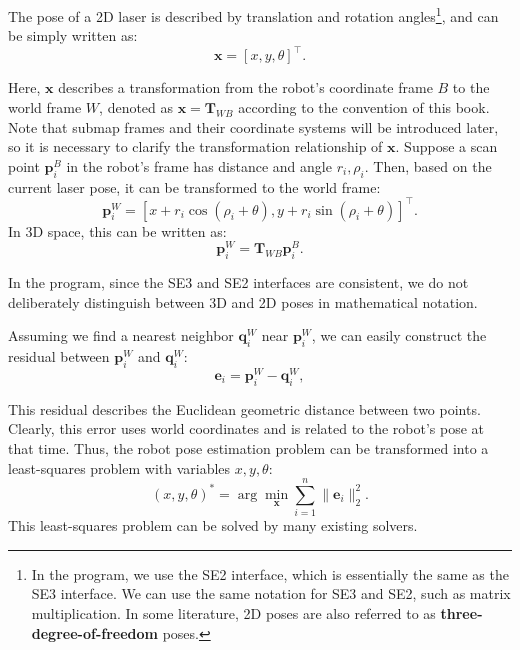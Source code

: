 The pose of a 2D laser is described by translation and rotation angles\footnote{In the program, we use the SE2 interface, which is essentially the same as the SE3 interface. We can use the same notation for SE3 and SE2, such as matrix multiplication. In some literature, 2D poses are also referred to as \textbf{three-degree-of-freedom} poses.}, and can be simply written as:
\begin{equation}\label{key}
	\bm{x} = [x, y, \theta]^\top.
\end{equation}

Here, $\bm{x}$ describes a transformation from the robot's coordinate frame $B$ to the world frame $W$, denoted as $\bm{x} = \bm{T}_{WB}$ according to the convention of this book. Note that submap frames and their coordinate systems will be introduced later, so it is necessary to clarify the transformation relationship of $\bm{x}$. Suppose a scan point $\bm{p}_i^B$ in the robot's frame has distance and angle $r_i, \rho_i$. Then, based on the current laser pose, it can be transformed to the world frame:
\begin{equation}\label{key}
	\bm{p}^W_i = [x+r_i \cos (\rho_i + \theta), y+r_i \sin(\rho_i + \theta)]^\top.
\end{equation}
In 3D space, this can be written as:
\begin{equation}\label{key}
	\bm{p}^W_i = \bm{T}_{WB} \bm{p}^B_i.
\end{equation}

In the program, since the SE3 and SE2 interfaces are consistent, we do not deliberately distinguish between 3D and 2D poses in mathematical notation.

Assuming we find a nearest neighbor $\bm{q}_i^W$ near $\bm{p}_i^W$, we can easily construct the residual between $\bm{p}_i^W$ and $\bm{q}_i^W$:
\begin{equation}\label{key}
	\bm{e}_i = \bm{p}_i^W - \bm{q}_i^W,
\end{equation}

This residual describes the Euclidean geometric distance between two points. Clearly, this error uses world coordinates and is related to the robot's pose at that time. Thus, the robot pose estimation problem can be transformed into a least-squares problem with variables $x, y, \theta$:
\begin{equation}\label{key}
	(x,y,\theta)^* = \arg \min\limits_{\bm{x}} \sum_{i=1}^n \| \bm{e}_i \|_2^2.
\end{equation}
This least-squares problem can be solved by many existing solvers.

